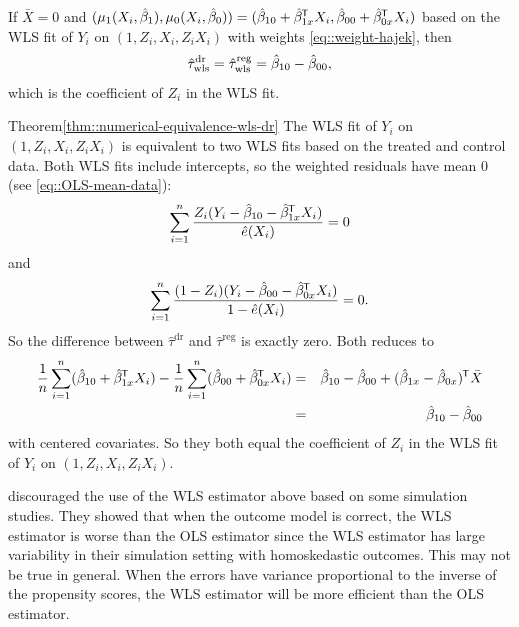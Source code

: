  

\begin{theorem}
\label{thm::numerical-equivalence-wls-dr}
If $\bar{X}=0$ and $( \mu_1(X_i, \hat{\beta}_1),  \mu_0(X_i, \hat{\beta}_0)) = (  \hat \beta_{10} +   \hat \beta_{1x}^{\mkern-1.5mu\mathsf{T}} X_i ,   \hat \beta_{00} +   \hat\beta_{0x}^{\mkern-1.5mu\mathsf{T}} X_i )$ based on the WLS fit of $Y_i$ on $(1,Z_i, X_i, Z_iX_i)$ with  weights \eqref{eq::weight-hajek}, then
$$
\hat{\tau}^\textup{dr}_\textup{wls}  = \hat{\tau}^\textup{reg}_\textup{wls} 
= \hat \beta_{10} - \hat \beta_{00} ,
$$
which is the coefficient of $Z_i$ in the WLS fit. 
\end{theorem}

\begin{myproof}{Theorem}{\ref{thm::numerical-equivalence-wls-dr}}
The WLS fit of $Y_i$ on $(1,Z_i, X_i, Z_iX_i)$ is equivalent to two WLS fits based on the treated and control data. Both WLS fits include intercepts, so the weighted residuals have mean 0 (see \eqref{eq::OLS-mean-data}): 
$$
\sum_{i=1}^n  \frac{Z_i ( Y_i- \hat \beta_{10} -  \hat \beta_{1x}^{\mkern-1.5mu\mathsf{T}} X_i ) }{  \hat{e}(X_i) }   =0 
$$
and
$$
\sum_{i=1}^n  \frac{(1-Z_i) (  Y_i-\hat \beta_{00}  -   \hat\beta_{0x}^{\mkern-1.5mu\mathsf{T}} X_i   ) }{  1-\hat{e}(X_i) }  = 0 .
$$
So the difference between $\hat{\tau}^\text{dr} $ and $\hat{\tau}^\text{reg}$ is exactly zero. Both reduces to
\begin{eqnarray*}
 \frac{1}{n} \sum_{i=1}^n (\hat \beta_{10} +   \hat \beta_{1x}^{\mkern-1.5mu\mathsf{T}} X_i)   - \frac{1}{n} \sum_{i=1}^n (\hat \beta_{00} +   \hat\beta_{0x}^{\mkern-1.5mu\mathsf{T}} X_i)  
&=& \hat \beta_{10} - \hat \beta_{00}  + (\hat \beta_{1x} - \hat\beta_{0x})^{\mkern-1.5mu\mathsf{T}} \bar{X} \\
&=&\hat \beta_{10} - \hat \beta_{00}
\end{eqnarray*}
with centered covariates. So they both equal the coefficient of $Z_i$ in the WLS fit of $Y_i$ on $(1,Z_i, X_i, Z_iX_i)$. 
\end{myproof} 


\citet{freedman2008weighting} discouraged the use of the WLS estimator above based on some simulation studies. They showed that when the outcome model is correct, the WLS estimator is worse than the OLS estimator since the WLS estimator has large variability in their simulation setting with homoskedastic outcomes. This may not be true in general. When the errors have variance proportional to the inverse of the propensity scores, the WLS estimator will be more efficient than the OLS estimator. 

